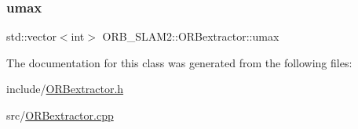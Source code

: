 \subsubsection{\texorpdfstring{umax}{umax}}
{\footnotesize\ttfamily std\+::vector$<$int$>$ O\+R\+B\+\_\+\+S\+L\+A\+M2\+::\+O\+R\+Bextractor\+::umax\hspace{0.3cm}{\ttfamily [protected]}}



The documentation for this class was generated from the following files\+:\begin{DoxyCompactItemize}
\item 
include/\mbox{\hyperlink{_o_r_bextractor_8h}{O\+R\+Bextractor.\+h}}\item 
src/\mbox{\hyperlink{_o_r_bextractor_8cpp}{O\+R\+Bextractor.\+cpp}}\end{DoxyCompactItemize}
